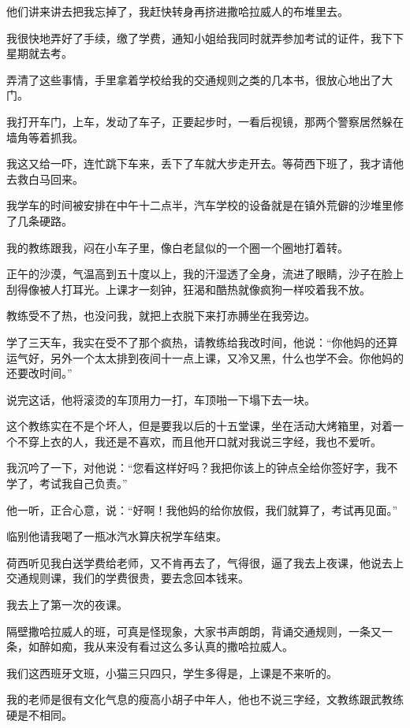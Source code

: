 \par 他们讲来讲去把我忘掉了，我赶快转身再挤进撒哈拉威人的布堆里去。
\par 我很快地弄好了手续，缴了学费，通知小姐给我同时就弄参加考试的证件，我下下星期就去考。
\par 弄清了这些事情，手里拿着学校给我的交通规则之类的几本书，很放心地出了大门。
\par 我打开车门，上车，发动了车子，正要起步时，一看后视镜，那两个警察居然躲在墙角等着抓我。
\par 我这又给一吓，连忙跳下车来，丢下了车就大步走开去。等荷西下班了，我才请他去救白马回来。
\par 我学车的时间被安排在中午十二点半，汽车学校的设备就是在镇外荒僻的沙堆里修了几条硬路。
\par 我的教练跟我，闷在小车子里，像白老鼠似的一个圈一个圈地打着转。
\par 正午的沙漠，气温高到五十度以上，我的汗湿透了全身，流进了眼睛，沙子在脸上刮得像被人打耳光。上课才一刻钟，狂渴和酷热就像疯狗一样咬着我不放。
\par 教练受不了热，也没问我，就把上衣脱下来打赤膊坐在我旁边。
\par 学了三天车，我实在受不了那个疯热，请教练给我改时间，他说：“你他妈的还算运气好，另外一个太太排到夜间十一点上课，又冷又黑，什么也学不会。你他妈的还要改时间。”
\par 说完这话，他将滚烫的车顶用力一打，车顶啪一下塌下去一块。
\par 这个教练实在不是个坏人，但是要我以后的十五堂课，坐在活动大烤箱里，对着一个不穿上衣的人，我还是不喜欢，而且他开口就对我说三字经，我也不爱听。
\par 我沉吟了一下，对他说：“您看这样好吗？我把你该上的钟点全给你签好字，我不学了，考试我自己负责。”
\par 他一听，正合心意，说：“好啊！我他妈的给你放假，我们就算了，考试再见面。”
\par 临别他请我喝了一瓶冰汽水算庆祝学车结束。
\par 荷西听见我白送学费给老师，又不肯再去了，气得很，逼了我去上夜课，他说去上交通规则课，我们的学费很贵，要去念回本钱来。
\par 我去上了第一次的夜课。
\par 隔壁撒哈拉威人的班，可真是怪现象，大家书声朗朗，背诵交通规则，一条又一条，如醉如痴，我从来没有看过这么多认真的撒哈拉威人。
\par 我们这西班牙文班，小猫三只四只，学生多得是，上课是不来听的。
\par 我的老师是很有文化气息的瘦高小胡子中年人，他也不说三字经，文教练跟武教练硬是不相同。
